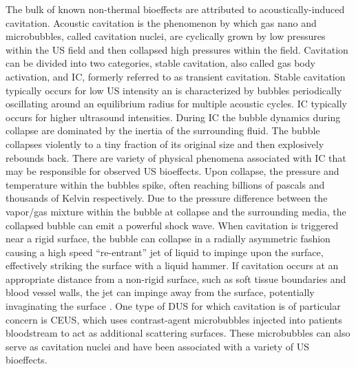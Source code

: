 The bulk of known non-thermal bioeffects are attributed to
acoustically-induced cavitation. Acoustic cavitation is the phenomenon
by which gas nano and microbubbles, called cavitation nuclei, are
cyclically grown by low pressures within the \ac{US} field and then
collapsed high pressures within the field. Cavitation can be divided
into two categories, stable cavitation, also called gas body
activation, and \ac{IC}, formerly referred to as transient
cavitation. Stable cavitation typically occurs for low \ac{US}
intensity an is characterized by bubbles periodically oscillating
around an equilibrium radius for multiple acoustic cycles. \ac{IC}
typically occurs for higher ultrasound intensities. During \ac{IC} the
bubble dynamics during collapse are dominated by the inertia of the
surrounding fluid. The bubble collapses violently to a tiny fraction
of its original size and then explosively rebounds back. There are
variety of physical phenomena associated with \ac{IC} that may be
responsible for observed \ac{US} bioeffects. Upon collapse, the
pressure and temperature within the bubbles spike, often reaching
billions of pascals and thousands of Kelvin respectively. Due to the
pressure difference between the vapor/gas mixture within the bubble at
collapse and the surrounding media, the collapsed bubble can emit a
powerful shock wave. When cavitation is triggered near a rigid
surface, the bubble can collapse in a radially asymmetric fashion
causing a high speed ``re-entrant'' jet of liquid to impinge upon the
surface, effectively striking the surface with a liquid hammer. If
cavitation occurs at an appropriate distance from a non-rigid surface,
such as soft tissue boundaries and blood vessel walls, the jet can
impinge away from the surface, potentially invaginating the surface
\citep{Brujan2011}. One type of \ac{DUS} for which cavitation is of
particular concern is \ac{CEUS}, which uses contrast-agent
microbubbles injected into patients bloodstream to act as additional
scattering surfaces. These microbubbles can also serve as cavitation
nuclei and have been associated with a variety of \ac{US} bioeffects. 

